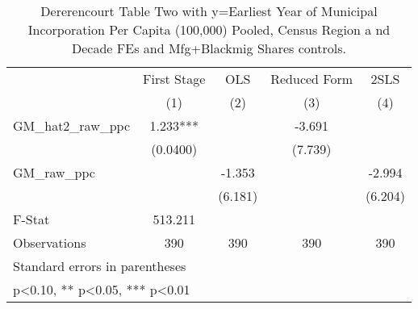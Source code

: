 \begin{table}[htbp]\centering
\def\sym#1{\ifmmode^{#1}\else\(^{#1}\)\fi}
\caption{Dererencourt Table Two with y=Earliest Year of Municipal Incorporation Per Capita (100,000) Pooled, Census Region a nd Decade FEs and Mfg+Blackmig Shares controls.}
\begin{tabular}{l*{4}{c}}
\toprule
                    & First Stage   &         OLS   &Reduced Form   &        2SLS   \\
                    &\multicolumn{1}{c}{(1)}   &\multicolumn{1}{c}{(2)}   &\multicolumn{1}{c}{(3)}   &\multicolumn{1}{c}{(4)}   \\
\midrule
GM\_hat2\_raw\_ppc     &       1.233***&               &      -3.691   &               \\
                    &    (0.0400)   &               &     (7.739)   &               \\
\addlinespace
GM\_raw\_ppc          &               &      -1.353   &               &      -2.994   \\
                    &               &     (6.181)   &               &     (6.204)   \\
\midrule
F-Stat              &     513.211   &               &               &               \\
Observations        &         390   &         390   &         390   &         390   \\
\bottomrule
\multicolumn{5}{l}{\footnotesize Standard errors in parentheses}\\
\multicolumn{5}{l}{\footnotesize * p<0.10, ** p<0.05, *** p<0.01}\\
\end{tabular}
\end{table}
